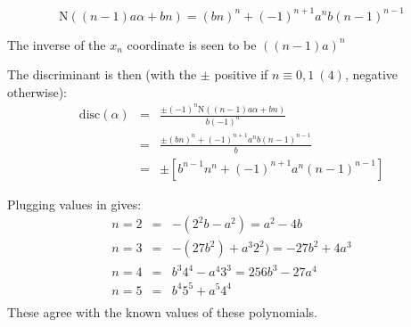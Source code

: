 \documentclass{article}
\newcommand{\norm}[1]{\text{N}(#1)}
\newcommand{\disc}[1]{\text{disc}(#1)}
\begin{document}
\begin{enumerate}
\[ \norm{(n-1)a \alpha + bn} = (bn)^n + (-1)^{n + 1} a^n b (n -1)^{n-1} \]

The inverse of the $x_n$ coordinate is seen to be $((n - 1)a)^n$

The discriminant is then (with the $\pm$ positive if $n \equiv 0, 1\ (4)$, negative otherwise):
\begin{eqnarray*}
    \disc{\alpha} &=& \frac{\pm (-1)^n \norm{(n - 1)a \alpha + bn}}{b(-1)^n}\\
    &=& \frac{\pm (bn)^n + (-1)^{n + 1} a^n b (n -1)^{n-1}}{b} \\
    &=& \pm [b^{n-1} n^n + (-1)^{n + 1} a^n (n -1)^{n-1}]
\end{eqnarray*}

Plugging values in gives:
\begin{eqnarray*}
    n = 2 &=& -(2^2 b -  a^2) = a^2 - 4b \\
    n = 3 &=& -(27b^2) + a^3 2^2) = -27b^2 + 4a^3 \\
    n = 4 &=& b^3 4^4 - a^4 3^3 = 256b^3 - 27a^4 \\
    n = 5 &=& b^4 5^5 + a^5 4^4 \\
\end{eqnarray*}
These agree with the known values of these polynomials.


\end{enumerate}
\end{document}
